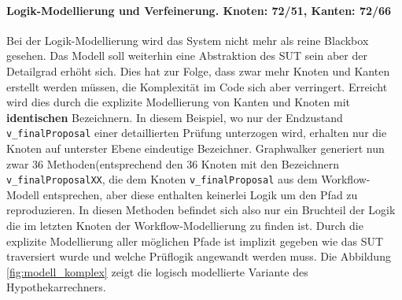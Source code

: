 \paragraph{Logik-Modellierung und Verfeinerung. Knoten: 72/51, Kanten: 72/66} Bei der Logik-Modellierung wird das System nicht mehr als reine Blackbox gesehen. Das Modell soll weiterhin eine Abstraktion des \Gls{SUT} sein aber der Detailgrad erhöht sich. Dies hat zur Folge, dass zwar mehr Knoten und Kanten erstellt werden müssen, die Komplexität im Code sich aber verringert. Erreicht wird dies durch die explizite Modellierung von Kanten und Knoten mit \textbf{identischen} Bezeichnern. In diesem Beispiel, wo nur der Endzustand \texttt{v\_finalProposal} einer detaillierten Prüfung unterzogen wird, erhalten nur die Knoten auf unterster Ebene eindeutige Bezeichner. Graphwalker generiert nun zwar 36 Methoden(entsprechend den 36 Knoten mit den Bezeichnern \texttt{v\_finalProposalXX}, die dem Knoten \texttt{v\_finalProposal} aus dem Workflow-Modell entsprechen, aber diese enthalten keinerlei Logik um den Pfad zu reproduzieren. In diesen Methoden befindet sich also nur ein Bruchteil der Logik die im letzten Knoten der Workflow-Modellierung zu finden ist. Durch die explizite Modellierung aller möglichen Pfade ist implizit gegeben wie das \Gls{SUT} traversiert wurde und welche Prüflogik angewandt werden muss. Die Abbildung \ref{fig:modell_komplex} zeigt die logisch modellierte Variante des Hypothekarrechners.


